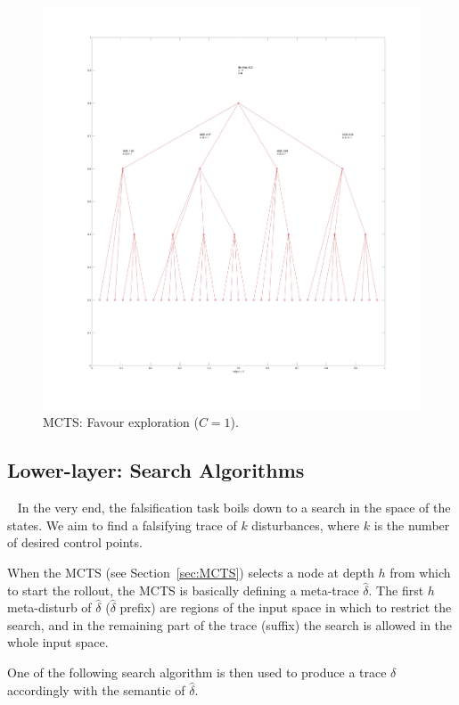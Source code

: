 \documentclass[11pt]{article}
\begin{document}
\begin{figure}
  \includegraphics[width=\linewidth]{img/c1.jpg}
  \caption{MCTS: Favour exploration ($C=1$).}
  \label{fig:c1}
\end{figure}

\subsection{Lower-layer: Search Algorithms}~\label{sec:srcalg}
In the very end, the falsification task boils down to a search in the space of the states. 
We aim to find a falsifying trace of $k$ disturbances, where $k$ is the number of desired control points. 

When the MCTS (see Section~\ref{sec:MCTS}) selects a node at depth $h$ from which to start the rollout, the MCTS is basically defining a meta-trace $\hat{\delta}$.
The first $h$ meta-disturb of $\hat{\delta}$ ($\hat{\delta}$ prefix) are regions of the input space in which to restrict the search, and in the remaining part of the trace (suffix) the search is allowed in the whole input space. 

One of the following search algorithm is then used to produce a trace $\delta$ accordingly with the semantic of $\hat{\delta}$.
\end{document}
